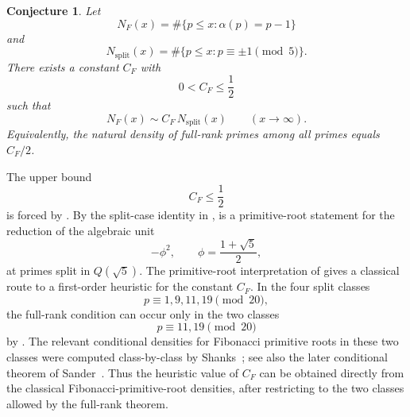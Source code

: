 \documentclass[preprint,12pt]{elsarticle}
\def\Q{Q}%
\numberwithin{equation}{section}
\theoremstyle{plain}
\newtheorem{conjecture}[theorem]{Conjecture}
\theoremstyle{definition}
\newcommand{\Q}{\mathbb{Q}}
\begin{document}
\begin{conjecture}\label{conj:density}
Let
\[
N_F(x)
=
\#\{p\le x:\alpha(p)=p-1\}
\]
and
\[
N_{\mathrm{split}}(x)
=
\#\{p\le x:p\equiv\pm1\pmod5\}.
\]
There exists a constant $C_F$ with
\[
0<C_F\le\frac12
\]
such that
\[
N_F(x)\sim C_F\,N_{\mathrm{split}}(x)
\qquad
(x\to\infty).
\]
Equivalently, the natural density of full-rank primes among all primes
equals $C_F/2$.
\end{conjecture}
 
The upper bound
\[
C_F\le\frac12
\]
is forced by . By the split-case identity in
,  is a primitive-root
statement for the reduction of the algebraic unit
\[
-\phi^2,
\qquad
\phi=\frac{1+\sqrt5}{2},
\]
at primes split in $\Q(\sqrt5)$.
The primitive-root interpretation of
 gives a classical route to a
first-order heuristic for the constant $C_F$. In the four split
classes
\[
p\equiv1,9,11,19\pmod{20},
\]
the full-rank condition can occur only in the two classes
\[
p\equiv11,19\pmod{20}
\]
by . The relevant conditional densities for Fibonacci
primitive roots in these two classes were computed class-by-class by
Shanks~\cite{Shanks1972}; see also the later conditional theorem of
Sander~\cite{Sander1990}. Thus the heuristic value of $C_F$ can be
obtained directly from the classical Fibonacci-primitive-root
densities, after restricting to the two classes allowed by the
full-rank theorem.
 
\end{document}
